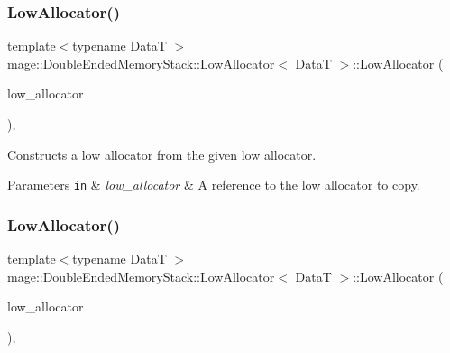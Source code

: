 \subsubsection{\texorpdfstring{Low\+Allocator()}{LowAllocator()}\hspace{0.1cm}{\footnotesize\ttfamily [1/4]}}
{\footnotesize\ttfamily template$<$typename DataT $>$ \\
\hyperlink{classmage_1_1_double_ended_memory_stack_1_1_low_allocator}{mage\+::\+Double\+Ended\+Memory\+Stack\+::\+Low\+Allocator}$<$ DataT $>$\+::\hyperlink{classmage_1_1_double_ended_memory_stack_1_1_low_allocator}{Low\+Allocator} (\begin{DoxyParamCaption}\item[{const \hyperlink{classmage_1_1_double_ended_memory_stack_1_1_low_allocator}{Low\+Allocator}$<$ DataT $>$ \&}]{low\+\_\+allocator }\end{DoxyParamCaption})\hspace{0.3cm}{\ttfamily [default]}, {\ttfamily [noexcept]}}

Constructs a low allocator from the given low allocator.


\begin{DoxyParams}[1]{Parameters}
\mbox{\tt in}  & {\em low\+\_\+allocator} & A reference to the low allocator to copy. \\
\hline
\end{DoxyParams}
\hypertarget{classmage_1_1_double_ended_memory_stack_1_1_low_allocator_ae72c7a214cad73bed8a3503b168ad960}{}\label{classmage_1_1_double_ended_memory_stack_1_1_low_allocator_ae72c7a214cad73bed8a3503b168ad960} 
\subsubsection{\texorpdfstring{Low\+Allocator()}{LowAllocator()}\hspace{0.1cm}{\footnotesize\ttfamily [2/4]}}
{\footnotesize\ttfamily template$<$typename DataT $>$ \\
\hyperlink{classmage_1_1_double_ended_memory_stack_1_1_low_allocator}{mage\+::\+Double\+Ended\+Memory\+Stack\+::\+Low\+Allocator}$<$ DataT $>$\+::\hyperlink{classmage_1_1_double_ended_memory_stack_1_1_low_allocator}{Low\+Allocator} (\begin{DoxyParamCaption}\item[{\hyperlink{classmage_1_1_double_ended_memory_stack_1_1_low_allocator}{Low\+Allocator}$<$ DataT $>$ \&\&}]{low\+\_\+allocator }\end{DoxyParamCaption})\hspace{0.3cm}{\ttfamily [default]}, {\ttfamily [noexcept]}}

